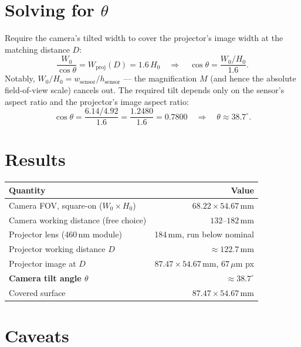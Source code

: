 \documentclass[11pt]{article}
\begin{document}
\section{Solving for \texorpdfstring{$\theta$}{theta}}
\label{sec:solving-theta}

Require the camera's tilted width to cover the projector's image width at
the matching distance $D$:
\begin{equation}
  \frac{W_0}{\cos\theta} = W_{\text{proj}}(D) = 1.6\, H_0
  \quad\Longrightarrow\quad
  \cos\theta = \frac{W_0 / H_0}{1.6}.
\end{equation}
Notably, $W_0/H_0 = w_{\text{sensor}}/h_{\text{sensor}}$ --- the
magnification $M$ (and hence the absolute field-of-view scale) cancels
out. The required tilt depends only on the sensor's aspect ratio and the
projector's image aspect ratio:
\begin{equation}
  \cos\theta = \frac{6.14/4.92}{1.6} = \frac{1.2480}{1.6} = 0.7800
  \quad\Longrightarrow\quad
  \theta \approx 38.7^\circ.
\end{equation}

\section{Results}

\begin{table}[h]
\centering
\begin{tabular}{@{}lr@{}}
\toprule
Quantity & Value \\
\midrule
Camera FOV, square-on ($W_0 \times H_0$) & $68.22 \times 54.67$\,mm \\
Camera working distance (free choice) & $132$--$182$\,mm \\
Projector lens (460\,nm module) & 184\,mm, run below nominal \\
Projector working distance $D$ & $\approx 122.7$\,mm \\
Projector image at $D$ & $87.47 \times 54.67$\,mm, $67\,\mu$m px \\
\textbf{Camera tilt angle $\theta$} & $\approx 38.7^\circ$ \\
Covered surface & $87.47 \times 54.67$\,mm \\
\bottomrule
\end{tabular}
\end{table}

\section{Caveats}
\end{document}
